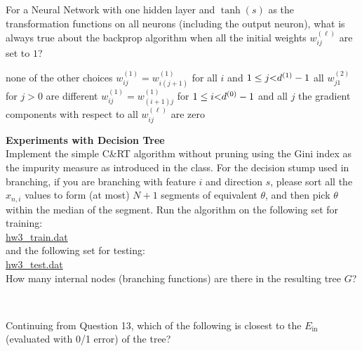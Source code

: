 \documentclass[a4paper,10pt]{exam}
\begin{document}
\begin{questions}
	    \question For a Neural Network with one hidden layer and $\tanh(s)$ as the transformation functions on all neurons (including the output neuron), what is always true about the backprop algorithm when all the initial weights $w_{ij}^{(\ell)}$ are set to $1$?
	    \begin{checkboxes}
	    	\choice none of the other choices
	    	\CorrectChoice $w_{ij}^{(1)} = w_{i(j+1)}^{(1)}$ for all $i$ and $1 \le j{\rm{  < }}{d^{(1)}} - 1$
	    	\choice all $w_{j1}^{(2)}$ for $j>0$ are different
	    	\choice $w_{ij}^{(1)} = w_{(i+1)j}^{(1)}$ for $1 \le i{\rm{  < }}{d^{(0)}} - 1$ and all $j$
	    	\choice the gradient components with respect to all $w_{ij}^{(\ell)}$ are zero\\
	    \end{checkboxes}
	    
	    \question \textbf{Experiments with Decision Tree}\\
	    Implement the simple C\&RT algorithm without pruning using the Gini index as the impurity measure as introduced in the class. For the decision stump used in branching, if you are branching with feature $i$ and direction $s$, please sort all the $x_{n, i}$ values to form (at most) $N+1$ segments of equivalent $\theta$, and then pick $\theta$ within the median of the segment. Run the algorithm on the following set for training:\\
	    \href{https://d396qusza40orc.cloudfront.net/ntumltwo/hw3_data/hw3_train.dat}{hw3\_train.dat}\\
	    and the following set for testing:\\
	    \href{https://d396qusza40orc.cloudfront.net/ntumltwo/hw3_data/hw3_test.dat}{hw3\_test.dat}\\
	    How many internal nodes (branching functions) are there in the resulting tree $G$?
	    \begin{checkboxes}
	    	\choice 12
	    	\choice 8
	    	\choice 14
	    	\CorrectChoice 10
	    	\choice 6\\
	    \end{checkboxes}
	    
	    \question Continuing from Question 13, which of the following is closest to the $E_{\text{in}}$ (evaluated with 0/1 error) of the tree?
	    \begin{checkboxes}
	    	\CorrectChoice 0.0
	    	\choice 0.1
	    	\choice 0.2
	    	\choice 0.3
	    	\choice 0.4\\
	    \end{checkboxes}
	    

\end{questions}
\end{document}
